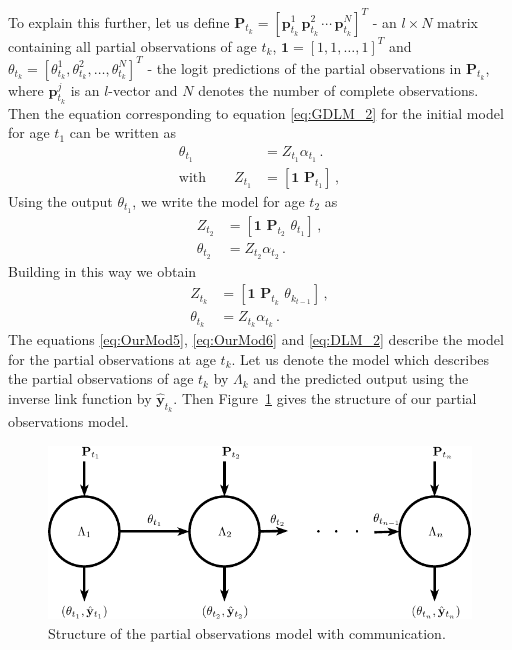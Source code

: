 \documentclass[a4paper,11pt]{article}
\begin{document}
To explain this further, let us define $\bm{P}_{t_k} = \left[ \bm{p}^1_{t_k}\, \bm{p}^2_{t_k}\, \cdots \, \bm{p}^N_{t_k} \right]^T$ - an $l \times N$ matrix containing all partial observations of age $t_k$, $\bm{1} = \left[ 1, 1, \dots, 1\right]^T$ and $\theta_{t_k} = \left[\theta^1_{t_k}, \theta^2_{t_k}, \dots, \theta^N_{t_k} \right]^T$ - the logit predictions of the partial observations in $\bm{P}_{t_k}$, where $\bm{p}^j_{t_k}$ is an $l$-vector and $N$ denotes the number of complete observations. %
Then the equation corresponding to equation \eqref{eq:GDLM_2} for the initial model for age $t_1$ can be written as
\begin{align}
	\theta_{t_1} & = Z_{t_1} \alpha_{t_1} \, . \label{eq:OurMod2}                     \\
	\text{with} \qquad
       Z_{t_1} & = [ \bm{1} \, \, \bm{P}_{t_1} ] \, , \label{eq:OurMod1}
\end{align}
Using the output $\theta_{t_1}$, we write the model for age $t_2$ as
\begin{align}
	Z_{t_2}      & = [ \bm{1} \, \, \bm{P}_{t_2} \, \, \theta_{t_1}] \, ,\label{eq:OurMod3} \\
	\theta_{t_2} & = Z_{t_2} \alpha_{t_2} \, . \label{eq:OurMod4}
\end{align}
Building in this way we obtain
\begin{align}
	Z_{t_k}      & = [ \bm{1} \, \, \bm{P}_{t_k} \, \, \theta_{k_{t-1}}] \, , \label{eq:OurMod5} \\
	\theta_{t_k} & = Z_{t_k} \alpha_{t_k} \, . \label{eq:OurMod6}
\end{align}
The equations \eqref{eq:OurMod5}, \eqref{eq:OurMod6} and \eqref{eq:DLM_2} describe the model for the partial observations at age $t_k$. Let us denote the model which describes the partial observations of age $t_k$ by $\Lambda_k$ and the predicted output using the inverse link function by $\hat{\bm{y}}_{t_k}$. Then Figure~\ref{fig:PODLM} gives the structure of our partial observations model.

\begin{figure}[!hb]
	\centering
	\includegraphics[clip=true,scale=0.8]{./Graphics/Lots_of_circles_3.pdf}
	\caption{Structure of the partial observations model with communication.}
	\label{fig:PODLM}
\end{figure}
\end{document}
